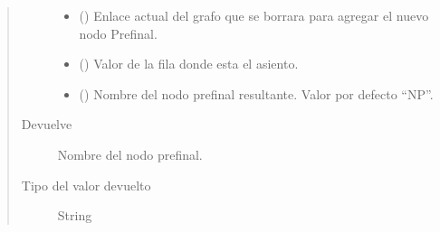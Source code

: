 \documentclass[letterpaper,10pt,spanish]{sphinxmanual}
\begin{document}
\begin{fulllineitems}
\begin{quote}
\begin{description}
\begin{itemize}
\item {} 
\sphinxAtStartPar
{} () \textendash{} Enlace actual del grafo que se borrara para agregar el nuevo nodo Prefinal.

\item {} 
\sphinxAtStartPar
{} () \textendash{} Valor de la fila donde esta el asiento.

\item {} 
\sphinxAtStartPar
{} (\sphinxstyleliteralemphasis{\sphinxupquote{, }}) \textendash{} Nombre del nodo prefinal resultante. Valor por defecto “NP”.

\end{itemize}

\item[{Devuelve}] \leavevmode
\sphinxAtStartPar
{} \textendash{} Nombre del nodo prefinal.

\item[{Tipo del valor devuelto}] \leavevmode
\sphinxAtStartPar
String

\end{description}\end{quote}

\end{fulllineitems}

\end{document}
